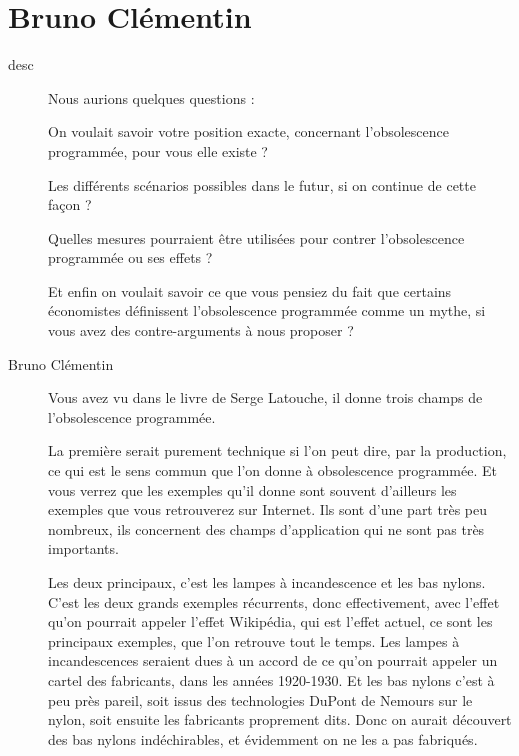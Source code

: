 \section{Bruno Clémentin}
\label{InterviewBClémentin}

\begin{description}
\item[desc]
\end{description}


\begin{description}

\item[] Nous aurions quelques questions : 

On voulait savoir votre position exacte, concernant l’obsolescence programmée, pour vous elle existe ?

Les différents scénarios possibles dans le futur, si on continue de cette façon ?

Quelles mesures pourraient être utilisées pour contrer l’obsolescence programmée ou ses effets ?

Et enfin on voulait savoir ce que vous pensiez du fait que certains économistes définissent l’obsolescence programmée comme un mythe, si vous avez des contre-arguments à nous proposer ?	

\item[Bruno Clémentin] Vous avez vu dans le livre de Serge Latouche, il donne trois champs de l'obsolescence programmée.
 
La première serait purement technique si l'on peut dire, par la production, ce qui est le sens commun que l'on donne à obsolescence programmée. Et vous verrez que les exemples qu'il donne sont souvent d'ailleurs les exemples que vous retrouverez sur Internet. Ils sont d'une part très peu nombreux, ils concernent des champs d'application qui ne sont pas très importants.
 
Les deux principaux, c'est les lampes à incandescence et les bas nylons. C'est les deux grands exemples récurrents, donc effectivement, avec l'effet qu'on pourrait appeler l'effet Wikipédia, qui est l'effet actuel, ce sont les principaux exemples, que l'on retrouve tout le temps.
Les lampes à incandescences seraient dues à un accord de ce qu'on pourrait appeler un cartel des fabricants, dans les années 1920-1930.
Et les bas nylons c'est à peu près pareil, soit issus des technologies DuPont de Nemours sur le nylon, soit ensuite les fabricants proprement dits. Donc on aurait découvert des bas nylons indéchirables, et évidemment on ne les a pas fabriqués.


\end{description}
